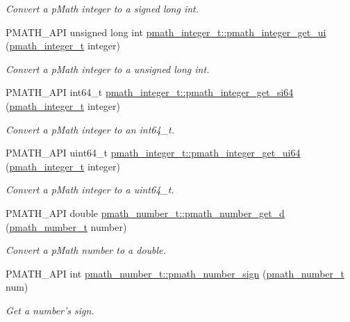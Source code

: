 \begin{CompactItemize}
\begin{CompactList}\small\item\em Convert a pMath integer to a signed long int. \item\end{CompactList}\item 
PMATH\_\-API unsigned long int \hyperlink{group__numbers_g0aed3b6f38410b7e42ffa52be73c6ea6}{pmath\_\-integer\_\-t::pmath\_\-integer\_\-get\_\-ui} (\hyperlink{classpmath__integer__t}{pmath\_\-integer\_\-t} integer)
\begin{CompactList}\small\item\em Convert a pMath integer to a unsigned long int. \item\end{CompactList}\item 
PMATH\_\-API int64\_\-t \hyperlink{group__numbers_g95e554207096c722e5be03f538ff7eae}{pmath\_\-integer\_\-t::pmath\_\-integer\_\-get\_\-si64} (\hyperlink{classpmath__integer__t}{pmath\_\-integer\_\-t} integer)
\begin{CompactList}\small\item\em Convert a pMath integer to an int64\_\-t. \item\end{CompactList}\item 
PMATH\_\-API uint64\_\-t \hyperlink{group__numbers_ged9add974a0fd79a3ecfb91e51280e96}{pmath\_\-integer\_\-t::pmath\_\-integer\_\-get\_\-ui64} (\hyperlink{classpmath__integer__t}{pmath\_\-integer\_\-t} integer)
\begin{CompactList}\small\item\em Convert a pMath integer to a uint64\_\-t. \item\end{CompactList}\item 
PMATH\_\-API double \hyperlink{group__numbers_g62617cbeeedaff88caaafec1dc84f329}{pmath\_\-number\_\-t::pmath\_\-number\_\-get\_\-d} (\hyperlink{classpmath__number__t}{pmath\_\-number\_\-t} number)
\begin{CompactList}\small\item\em Convert a pMath number to a double. \item\end{CompactList}\item 
PMATH\_\-API int \hyperlink{group__numbers_g7a736f04d207d140b3b052438cc371d0}{pmath\_\-number\_\-t::pmath\_\-number\_\-sign} (\hyperlink{classpmath__number__t}{pmath\_\-number\_\-t} num)
\begin{CompactList}\small\item\em Get a number's sign. \item\end{CompactList}\item 

\end{CompactItemize}
